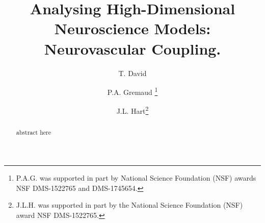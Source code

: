 \documentclass[smallextended]{svjour3}
\numberwithin{equation}{section}
\begin{document}
\title{Analysing High-Dimensional Neuroscience Models: Neurovascular Coupling. }
\author{ T. David \and P.A. Gremaud  \thanks{P.A.G. was supported in part by National Science Foundation (NSF) awards NSF DMS-1522765 and DMS-1745654.}\and J.L. Hart\thanks{J.L.H. was supported in part by the National Science Foundation (NSF) award NSF DMS-1522765.}}
\maketitle
\thispagestyle{empty}

\begin{abstract}
abstract here 
\end{abstract}




  











\end{document}
